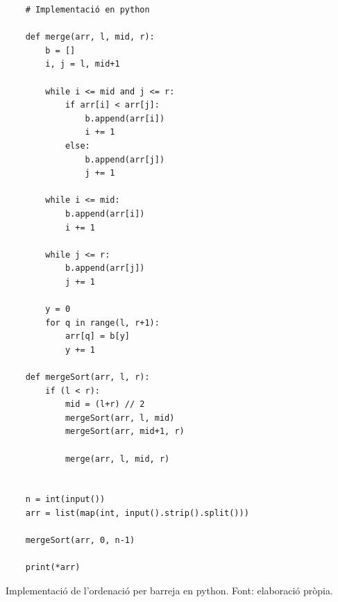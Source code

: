 \begin{longlisting}
    \begin{verbatim}
    # Implementació en python
    
    def merge(arr, l, mid, r):
        b = []
        i, j = l, mid+1
    
        while i <= mid and j <= r:
            if arr[i] < arr[j]:
                b.append(arr[i])
                i += 1
            else:
                b.append(arr[j])
                j += 1
    
        while i <= mid:
            b.append(arr[i])
            i += 1
    
        while j <= r:
            b.append(arr[j])
            j += 1
    
        y = 0
        for q in range(l, r+1):
            arr[q] = b[y]
            y += 1
    
    def mergeSort(arr, l, r):
        if (l < r):
            mid = (l+r) // 2
            mergeSort(arr, l, mid)
            mergeSort(arr, mid+1, r)
    
            merge(arr, l, mid, r)
    
    
    n = int(input())
    arr = list(map(int, input().strip().split()))
    
    mergeSort(arr, 0, n-1)
    
    print(*arr)
    \end{verbatim}
    \caption[Implementació de l'ordenació per barreja en python.]{Implementació de l'ordenació per barreja en python. Font: elaboració pròpia.}
    \label{Figura}
\end{longlisting}
